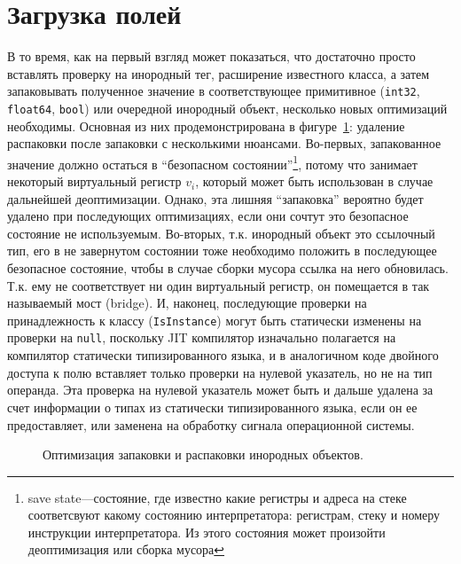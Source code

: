 \documentclass[times,specification,annotation]{itmo-student-thesis}
\begin{document}
\section{Загрузка полей}
В то время, как на первый взгляд может показаться, что достаточно просто вставлять проверку на инородный тег, расширение известного класса, а затем запаковывать полученное значение в соответствующее примитивное (\texttt{int32}, \texttt{float64}, \texttt{bool}) или очередной инородный объект, несколько новых оптимизаций необходимы. Основная из них продемонстрирована в фигуре~\ref{fig:field-opt}: удаление распаковки после запаковки с несколькими нюансами. Во-первых, запакованное значение должно остаться в ``безопасном состоянии''\footnote{save state---состояние, где известно какие регистры и адреса на стеке соответсвуют какому состоянию интерпретатора: регистрам, стеку и номеру инструкции интерпретатора. Из этого состояния может произойти деоптимизация или сборка мусора}, потому что занимает некоторый виртуальный регистр $v_i$, который может быть использован в случае дальнейшей деоптимизации. Однако, эта лишняя ``запаковка'' вероятно будет удалено при последующих оптимизациях, если они сочтут это безопасное состояние не используемым. Во-вторых, т.к. инородный объект это ссылочный тип, его в не завернутом состоянии тоже необходимо положить в последующее безопасное состояние, чтобы в случае сборки мусора ссылка на него обновилась. Т.к. ему не соответствует ни один виртуальный регистр, он помещается в так называемый мост (bridge). И, наконец, последующие проверки на принадлежность к классу (\texttt{IsInstance}) могут быть статически изменены на проверки на \texttt{null}, поскольку JIT компилятор изначально полагается на компилятор статически типизированного языка, и в аналогичном коде двойного доступа к полю вставляет только проверки на нулевой указатель, но не на тип операнда. Эта проверка на нулевой указатель может быть и дальше удалена за счет информации о типах из статически типизированного языка, если он ее предоставляет, или заменена на обработку сигнала операционной системы.

\begin{figure}[H]
	\caption{Оптимизация запаковки и распаковки инородных объектов.}\label{fig:field-opt}
	\centering
	\end{figure}
\end{document}
